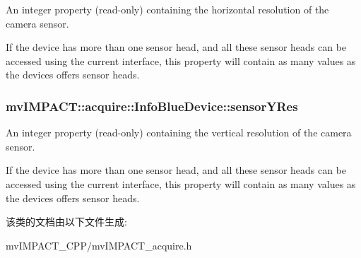 An integer property {\bfseries }(read-\/only) containing the horizontal resolution of the camera sensor. 

If the device has more than one sensor head, and all these sensor heads can be accessed using the current interface, this property will contain as many values as the devices offers sensor heads. \hypertarget{classmv_i_m_p_a_c_t_1_1acquire_1_1_info_blue_device_ade697938bd71524589e433abe30a39d9}{
\subsubsection[{sensor\+Y\+Res}]{ mv\+I\+M\+P\+A\+C\+T\+::acquire\+::\+Info\+Blue\+Device\+::sensor\+Y\+Res}}\label{classmv_i_m_p_a_c_t_1_1acquire_1_1_info_blue_device_ade697938bd71524589e433abe30a39d9}


An integer property {\bfseries }(read-\/only) containing the vertical resolution of the camera sensor. 

If the device has more than one sensor head, and all these sensor heads can be accessed using the current interface, this property will contain as many values as the devices offers sensor heads. 

该类的文档由以下文件生成\+:\begin{DoxyCompactItemize}
\item 
mv\+I\+M\+P\+A\+C\+T\+\_\+\+C\+P\+P/mv\+I\+M\+P\+A\+C\+T\+\_\+acquire.\+h\end{DoxyCompactItemize}

